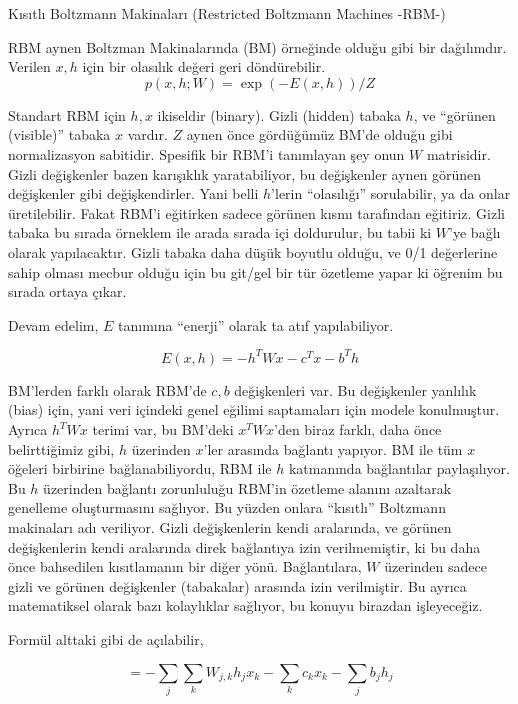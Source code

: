 \documentclass[12pt,fleqn]{article}\usepackage{../../common}
\begin{document}
Kısıtlı Boltzmann Makinaları (Restricted Boltzmann Machines -RBM-)

RBM aynen Boltzman Makinalarında (BM) örneğinde olduğu gibi bir
dağılımdır. Verilen $x,h$ için bir olasılık değeri geri döndürebilir.
$$ p(x,h;W) = \exp (-E(x,h)) / Z $$

Standart RBM için $h,x$ ikiseldir (binary). Gizli (hidden) tabaka $h$, ve
``görünen (visible)'' tabaka $x$ vardır. $Z$ aynen önce gördüğümüz BM'de
olduğu gibi normalizasyon sabitidir. Spesifik bir RBM'i tanımlayan şey onun
$W$ matrisidir. Gizli değişkenler bazen karışıklık yaratabiliyor, bu
değişkenler aynen görünen değişkenler gibi değişkendirler. Yani belli
$h$'lerin ``olasılığı'' sorulabilir, ya da onlar üretilebilir. Fakat RBM'i
eğitirken sadece görünen kısmı tarafından eğitiriz. Gizli tabaka bu sırada
örneklem ile arada sırada içi doldurulur, bu tabii ki $W$'ye bağlı olarak
yapılacaktır. Gizli tabaka daha düşük boyutlu olduğu, ve 0/1 değerlerine
sahip olması mecbur olduğu için bu git/gel bir tür özetleme yapar ki
öğrenim bu sırada ortaya çıkar.

Devam edelim, $E$ tanımına ``enerji'' olarak ta atıf yapılabiliyor.

$$ E(x,h) = -h^TWx - c^Tx - b^Th $$

BM'lerden farklı olarak RBM'de $c,b$ değişkenleri var. Bu değişkenler
yanlılık (bias) için, yani veri içindeki genel eğilimi saptamaları için
modele konulmuştur. Ayrıca $h^TWx$ terimi var, bu BM'deki $x^TWx$'den biraz
farklı, daha önce belirttiğimiz gibi, $h$ üzerinden $x$'ler arasında
bağlantı yapıyor. BM ile tüm $x$ öğeleri birbirine bağlanabiliyordu, RBM
ile $h$ katmanında bağlantılar paylaşılıyor. Bu $h$ üzerinden bağlantı
zorunluluğu RBM'in özetleme alanını azaltarak genelleme oluşturmasını
sağlıyor. Bu yüzden onlara ``kısıtlı'' Boltzmann makinaları adı
veriliyor. Gizli değişkenlerin kendi aralarında, ve görünen değişkenlerin
kendi aralarında direk bağlantıya izin verilmemiştir, ki bu daha önce
bahsedilen kısıtlamanın bir diğer yönü. Bağlantılara, $W$ üzerinden sadece
gizli ve görünen değişkenler (tabakalar) arasında izin verilmiştir. Bu
ayrıca matematiksel olarak bazı kolaylıklar sağlıyor, bu konuyu birazdan
işleyeceğiz.

Formül alttaki gibi de açılabilir,

$$ = - \sum_j \sum_k W_{j,k}h_jx_k - \sum_k c_kx_k - \sum_j b_jh_j  $$
\end{document}
